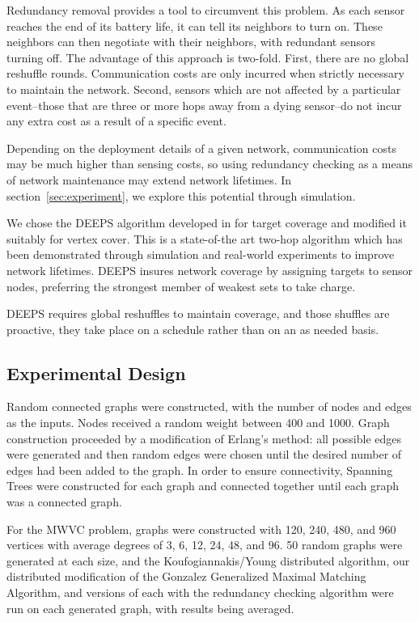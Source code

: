 Redundancy removal provides a tool to circumvent this problem. As each sensor reaches the end of its battery life, it can tell its neighbors to turn on. These neighbors can then negotiate with their neighbors, with redundant sensors turning off. The advantage of this approach is two-fold. First, there are no global reshuffle rounds. Communication costs are only incurred when strictly necessary to maintain the network. Second, sensors which are not affected by a particular event--those that are three or more hops away from a dying sensor--do not incur any extra cost as a result of a specific event.

Depending on the deployment details of a given network, communication costs may be much higher than sensing costs, so using redundancy checking as a means of network maintenance may extend network lifetimes. In section~\ref{sec:experiment}, we explore this potential through simulation.

We chose the DEEPS algorithm developed in \cite{1640702}for target coverage and modified it suitably for vertex cover. This is a state-of-the art two-hop algorithm which has been demonstrated through simulation and real-world experiments to improve network lifetimes. DEEPS insures network coverage by assigning targets to sensor nodes, preferring the strongest member of weakest sets to take charge. 

DEEPS requires global reshuffles to maintain coverage, and those shuffles are proactive, they take place on a schedule rather than on an as needed basis.

\subsection{Experimental Design}
\label{sub:exp-design}
Random connected graphs were constructed, with the number of nodes and edges as the inputs. Nodes received a random weight between 400 and 1000. Graph construction proceeded by a modification of Erlang's method: all possible edges were generated and then random edges were chosen until the desired number of edges had been added to the graph. In order to ensure connectivity, Spanning Trees were constructed for each graph and connected together until each graph was a connected graph. 

For the MWVC problem, graphs were constructed with 120, 240, 480, and 960 vertices with average degrees of 3, 6, 12, 24, 48, and 96. 50 random graphs were generated at each size, and the Koufogiannakis/Young distributed algorithm\cite{1582746}, our distributed modification of the Gonzalez Generalized Maximal Matching Algorithm\cite{Gonzalez1995129}, and versions of each with the redundancy checking algorithm were run on each generated graph, with results being averaged.

